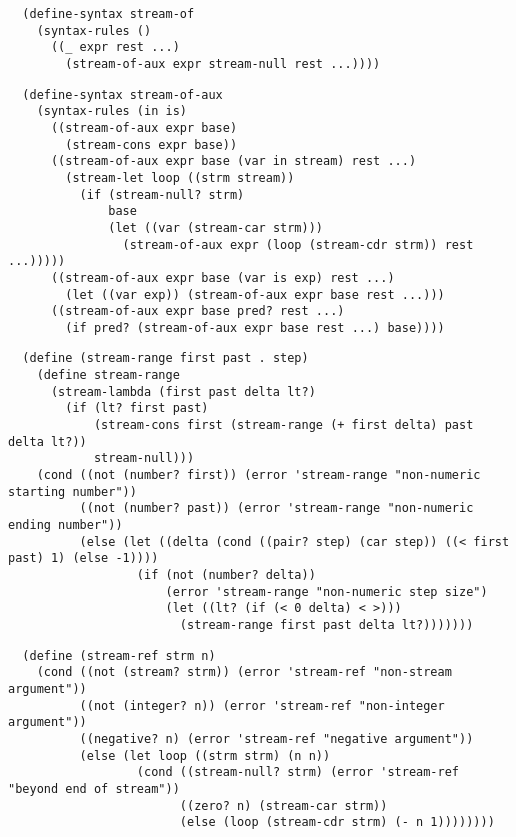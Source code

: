 \begin{verbatim}
  (define-syntax stream-of
    (syntax-rules ()
      ((_ expr rest ...)
        (stream-of-aux expr stream-null rest ...))))
\end{verbatim}

\begin{verbatim}
  (define-syntax stream-of-aux
    (syntax-rules (in is)
      ((stream-of-aux expr base)
        (stream-cons expr base))
      ((stream-of-aux expr base (var in stream) rest ...)
        (stream-let loop ((strm stream))
          (if (stream-null? strm)
              base
              (let ((var (stream-car strm)))
                (stream-of-aux expr (loop (stream-cdr strm)) rest ...)))))
      ((stream-of-aux expr base (var is exp) rest ...)
        (let ((var exp)) (stream-of-aux expr base rest ...)))
      ((stream-of-aux expr base pred? rest ...)
        (if pred? (stream-of-aux expr base rest ...) base))))
\end{verbatim}

\begin{verbatim}
  (define (stream-range first past . step)
    (define stream-range
      (stream-lambda (first past delta lt?)
        (if (lt? first past)
            (stream-cons first (stream-range (+ first delta) past delta lt?))
            stream-null)))
    (cond ((not (number? first)) (error 'stream-range "non-numeric starting number"))
          ((not (number? past)) (error 'stream-range "non-numeric ending number"))
          (else (let ((delta (cond ((pair? step) (car step)) ((< first past) 1) (else -1))))
                  (if (not (number? delta))
                      (error 'stream-range "non-numeric step size")
                      (let ((lt? (if (< 0 delta) < >)))
                        (stream-range first past delta lt?)))))))
\end{verbatim}

\begin{verbatim}
  (define (stream-ref strm n)
    (cond ((not (stream? strm)) (error 'stream-ref "non-stream argument"))
          ((not (integer? n)) (error 'stream-ref "non-integer argument"))
          ((negative? n) (error 'stream-ref "negative argument"))
          (else (let loop ((strm strm) (n n))
                  (cond ((stream-null? strm) (error 'stream-ref "beyond end of stream"))
                        ((zero? n) (stream-car strm))
                        (else (loop (stream-cdr strm) (- n 1))))))))
\end{verbatim}

